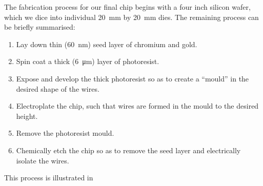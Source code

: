The fabrication process for our final chip begins with a four inch silicon
wafer, which we dice into individual \SI{20}{\milli\meter} by
\SI{20}{\milli\meter} dies. The remaining process can be briefly summarised:
\begin{enumerate}
\item Lay down thin (\SI{60}{\nano\meter}) seed layer of chromium and gold.
\item Spin coat a thick (\SI{6}{\micro\meter}) layer of photoresist.
\item Expose and develop the thick photoresist so as to create a ``mould''
in the desired shape of the wires.
\item Electroplate the chip, such that wires are formed in the mould to the
desired height.
\item Remove the photoresist mould.
\item Chemically etch the chip so as to remove the seed layer and
  electrically isolate the wires.
\end{enumerate}
This process is illustrated in 

